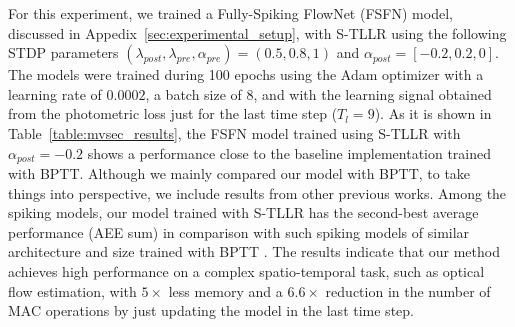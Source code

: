 \documentclass[10pt]{article} %
\begin{document}
        
        For this experiment, we trained a Fully-Spiking FlowNet (FSFN) model, discussed in Appedix~\ref{sec:experimental_setup}, with S-TLLR using the following STDP parameters $(\lambda_{post}, \lambda_{pre}, \alpha_{pre}) =(0.5, 0.8, 1)$ and $\alpha_{post}=[-0.2, 0.2, 0]$. 
        The models were trained during 100 epochs using the Adam optimizer with a learning rate of $0.0002$, a batch size of $8$, and with the learning signal obtained from the photometric loss just for the last time step ($T_l=9$).
        As it is shown in Table~\ref{table:mvsec_results}, the FSFN model trained using S-TLLR with $\alpha_{post}=-0.2$ shows a performance close to the baseline implementation trained with BPTT.
        Although we mainly compared our model with BPTT, to take things into perspective, we include results from other previous works.
        Among the spiking models, our model trained with S-TLLR has the second-best average performance (AEE sum) in comparison with such spiking models of similar architecture and size trained with BPTT \citep{Apolinario2023Hardware/SoftwareNetworks, Kosta2023Adaptive-SpikeNet:Dynamics, Hagenaars2021Self-SupervisedNetworks}.
        The results indicate that our method achieves high performance on a complex spatio-temporal task, such as optical flow estimation, with  $5\times$ less memory and a $6.6\times$ reduction in the number of MAC operations by just updating the model in the last time step. 
        


        
\end{document}
